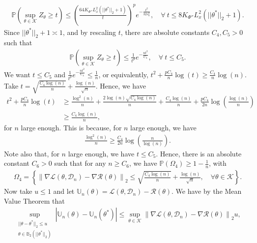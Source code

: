 \documentclass{article}
\begin{document}
\begin{align*}
\mathbb{P}\left(\mathop{\sup}\limits_{\theta \in \mathcal{K}}Z_\theta \geq t\right) \leq \left(\frac{64K_{\Phi''}L_x^2(||\theta^*||_2  + 1)}{t}\right)^pe^{-\frac{t^2}{32s_n^2}}, \quad \forall \ t \leq 8K_{\Phi''}L_x^2(||\theta^*||_2  + 1).
\end{align*}
Since $||\theta^*||_2 + 1 \asymp 1$, and by rescaling $t$, there are absolute constants $C_4, C_5 > 0$ such that
\begin{align*}
\mathbb{P}\left(\mathop{\sup}\limits_{\theta \in \mathcal{K}}Z_\theta \geq t\right) \leq \frac{1}{t^p}e^{-\frac{nt^2}{C_4}}, \quad \forall \ t \leq C_5.
\end{align*}
We want $t \leq C_5$ and $\frac{1}{t^p}e^{-\frac{nt^2}{C_4}} \leq \frac{1}{n}$, or equivalently, $t^2 + \frac{pC_4}{n}\log(t) \geq \frac{C_4}{n}\log(n)$. Take $t = \sqrt{\frac{C_4\log(n)}{n}} + \frac{\log(n)}{\sqrt{n}}$. Hence, we have
\begin{align*}
t^2 + \frac{pC_4}{n}\log(t) &\geq \frac{\log^2(n)}{n} + \frac{2\log(n)\sqrt{C_4\log(n)}}{n} + \frac{C_4\log(n)}{n} + \frac{pC_4}{2n}\log\left(\frac{\log(n)}{n}\right)\\
&\geq \frac{C_4\log(n)}{n},
\end{align*}
for $n$ large enough. This is because, for $n$ large enough, we have
\begin{align*}
\frac{\log^2(n)}{n} \geq \frac{C_4}{2n}\log\left(\frac{n}{\log(n)}\right).
\end{align*}
Note also that, for $n$ large enough, we have $t \leq C_5$. Hence, there is an absolute constant $C_6 > 0$ such that for any $n \geq C_6$, we have $\mathbb{P}(\Omega_4) \geq 1 - \frac{1}{n}$, with
\begin{align*}
\Omega_4 = \left\{\left\|\nabla\mathcal{L}(\theta, \mathcal{D}_n) - \nabla\mathcal{R}(\theta)\right\|_2 \leq \sqrt{\frac{C_4\log(n)}{n}} + \frac{\log(n)}{\sqrt{n}}, \quad \forall \theta \in \mathcal{K}\right\}.
\end{align*}
Now take $u \leq 1$ and let $\mathbb{U}_n(\theta) = \mathcal{L}(\theta, \mathcal{D}_n) - \mathcal{R}(\theta)$. We have by the Mean Value Theorem that 
\begin{align*}
\mathop{\sup}_{\substack{||\theta - \theta^*||_2 \leq u\\ \theta \in \mathbb{B}_2(||\theta^*||_2)}}\left|\mathbb{U}_n(\theta) - \mathbb{U}_n(\theta^*)\right| \leq \mathop{\sup}\limits_{\theta \in \mathcal{K}}\left\|\nabla\mathcal{L}(\theta, \mathcal{D}_n) - \nabla\mathcal{R}(\theta)\right\|_2u,
\end{align*}
\end{document}

